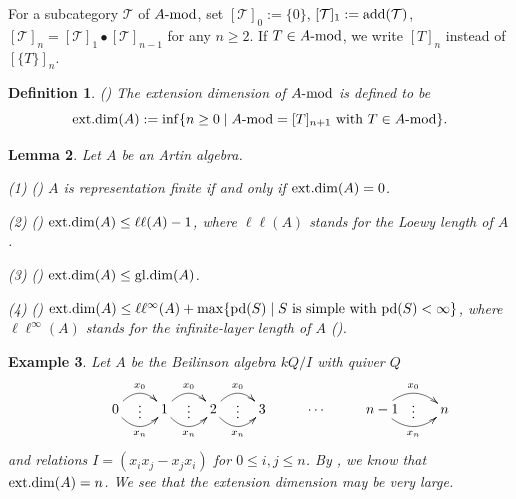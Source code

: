 \documentclass[12pt]{article}
\numberwithin{equation}{section}
\newtheorem{Def}{Definition}[section]
\newtheorem{Bsp}[Def]{Example}%
\newtheorem{Lem}[Def]{Lemma}
\theoremstyle{definition}
\newcommand{\add}{{\rm add}}
\newcommand{\gd}{{\rm gl.dim }}
\def\ed{\mathop{\rm ext.dim}\nolimits}
\newcommand{\pd}{{\rm pd}}
\newcommand{\T}{{\mathcal T}}
\newcommand{\modcat}{\ensuremath{\mbox{{\rm -mod}}}}
\begin{document}
For a subcategory $\T$ of $A\modcat$, set $[\T]_{0}:=\{0\}$, $[\T]_{1}:=\add(\T)$,  $[\T]_{n}=[\T]_1\bullet [\T]_{n-1}$ for any $n\ge 2$. If $T\in A\modcat$, we write $[T]_{n}$ instead of $[\{T\}]_{n}$.
\begin{Def}\label{ed-def}{\rm (\cite{b08})} {\rm The extension dimension of $A\modcat$ is defined to be
$$\ed(A):=\inf\{n\ge 0\mid A\modcat=[T]_{n+1}\mbox{ with } T\in A\modcat\}.$$
}
\end{Def}

\begin{Lem} \label{ext-lem}
Let $A$ be an Artin algebra.

{\rm(1) (\cite[Example 1.6]{b08})} $A$ is representation finite if and only if $\ed(A)=0$.

{\rm(2) (\cite[Example 1.6]{b08})} $\ed(A)\le \ell\ell(A)-1$, where $\ell\ell(A)$ stands for the Loewy length of $A$.

{\rm(3) (\cite[Corollary 3.6]{zheng2020})} $\ed(A)\le \gd(A)$.

{\rm(4) (\cite[Corollary 3.15]{zh22})} $\ed(A)\le \ell\ell^{\infty}(A)+\max\{\pd(S)\mid S\mbox{ is simple with }\pd(S)<\infty\}$, where $\ell\ell^{\infty}(A)$ stands for the infinite-layer length of $A$ {\rm(\cite{hlh09, hlh13})}.

\end{Lem}
\begin{Bsp}{\rm
Let $A$ be the Beilinson algebra $kQ/I$ with quiver $Q$
$$\xymatrix{
&0 \ar@/_1pc/[r]_{x_{n}}\ar@/^1pc/[r]^{x_{0}}_{\vdots}
&1\ar@/_1pc/[r]_{x_{n}}\ar@/^1pc/[r]^{x_{0}}_{\vdots}
&2\ar@/_1pc/[r]_{x_{n}}\ar@/^1pc/[r]^{x_{0}}_{\vdots}
&3&\cdots &n-1\ar@/_1pc/[r]_{x_{n}}\ar@/^1pc/[r]^{x_{0}}_{\vdots}&n
}$$
and relations $I=(x_{i}x_{j}-x_{j}x_{i})$ for $0 \le i, j \le n$. By \cite[Example 3.4]{zh22}, we know that $\ed(A)=n$.
We see that the extension dimension may be very large.
}
\end{Bsp}
\end{document}
